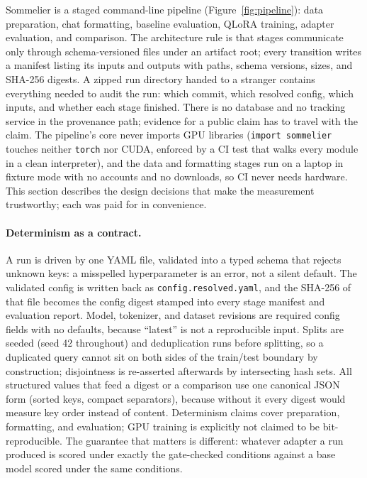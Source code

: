 \documentclass{article}
\newcommand{\sommelier}{Sommelier}
\begin{document}
\sommelier{} is a staged command-line pipeline (Figure~\ref{fig:pipeline}): data preparation, chat formatting, baseline evaluation, QLoRA training, adapter evaluation, and comparison. The architecture rule is that stages communicate only through schema-versioned files under an artifact root; every transition writes a manifest listing its inputs and outputs with paths, schema versions, sizes, and SHA-256 digests. A zipped run directory handed to a stranger contains everything needed to audit the run: which commit, which resolved config, which inputs, and whether each stage finished. There is no database and no tracking service in the provenance path; evidence for a public claim has to travel with the claim. The pipeline's core never imports GPU libraries (\texttt{import sommelier} touches neither \texttt{torch} nor CUDA, enforced by a CI test that walks every module in a clean interpreter), and the data and formatting stages run on a laptop in fixture mode with no accounts and no downloads, so CI never needs hardware. This section describes the design decisions that make the measurement trustworthy; each was paid for in convenience.

\paragraph{Determinism as a contract.}
A run is driven by one YAML file, validated into a typed schema that rejects unknown keys: a misspelled hyperparameter is an error, not a silent default. The validated config is written back as \texttt{config.resolved.yaml}, and the SHA-256 of that file becomes the config digest stamped into every stage manifest and evaluation report. Model, tokenizer, and dataset revisions are required config fields with no defaults, because ``latest'' is not a reproducible input. Splits are seeded (seed 42 throughout) and deduplication runs before splitting, so a duplicated query cannot sit on both sides of the train/test boundary by construction; disjointness is re-asserted afterwards by intersecting hash sets. All structured values that feed a digest or a comparison use one canonical JSON form (sorted keys, compact separators), because without it every digest would measure key order instead of content. Determinism claims cover preparation, formatting, and evaluation; GPU training is explicitly not claimed to be bit-reproducible. The guarantee that matters is different: whatever adapter a run produced is scored under exactly the gate-checked conditions against a base model scored under the same conditions.
\end{document}
